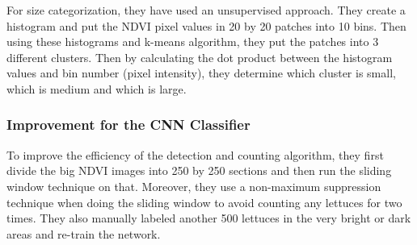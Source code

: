\documentclass{article}
\begin{document}
For size categorization, they have used an unsupervised approach. They create a histogram and put the NDVI pixel values in 20 by 20 patches into 10 bins. Then using these histograms and k-means algorithm, they put the patches into 3 different clusters. Then by calculating the dot product between the histogram values and bin number (pixel intensity), they determine which cluster is small, which is medium and which is large. 

\subsubsection{Improvement for the CNN Classifier}

To improve the efficiency of the detection and counting algorithm, they first divide the big NDVI images into 250 by 250 sections and then run the sliding window technique on that. Moreover, they use a non-maximum suppression technique when doing the sliding window to avoid counting any lettuces for two times. They also manually labeled another 500 lettuces in the very bright or dark areas and re-train the network. 



	
\end{document}
